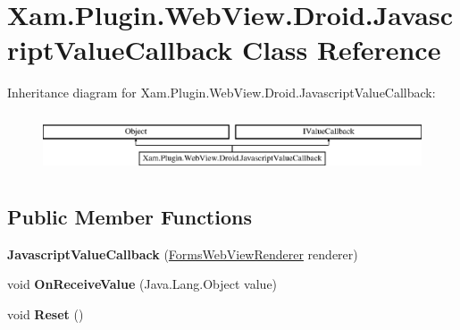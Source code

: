\hypertarget{class_xam_1_1_plugin_1_1_web_view_1_1_droid_1_1_javascript_value_callback}{}\section{Xam.\+Plugin.\+Web\+View.\+Droid.\+Javascript\+Value\+Callback Class Reference}
\label{class_xam_1_1_plugin_1_1_web_view_1_1_droid_1_1_javascript_value_callback}
Inheritance diagram for Xam.\+Plugin.\+Web\+View.\+Droid.\+Javascript\+Value\+Callback\+:\begin{figure}[H]
\begin{center}
\leavevmode
\includegraphics[height=1.744548cm]{class_xam_1_1_plugin_1_1_web_view_1_1_droid_1_1_javascript_value_callback}
\end{center}
\end{figure}
\subsection*{Public Member Functions}
\begin{DoxyCompactItemize}
\item 
\mbox{\label{class_xam_1_1_plugin_1_1_web_view_1_1_droid_1_1_javascript_value_callback_a248ae541c647ac1231a6ed3a1999c8ce}} 
{\bfseries Javascript\+Value\+Callback} (\hyperlink{class_xam_1_1_plugin_1_1_web_view_1_1_droid_1_1_forms_web_view_renderer}{Forms\+Web\+View\+Renderer} renderer)
\item 
\mbox{\label{class_xam_1_1_plugin_1_1_web_view_1_1_droid_1_1_javascript_value_callback_ac105ffd11a3eaaf7abbd6cdeaa73509a}} 
void {\bfseries On\+Receive\+Value} (Java.\+Lang.\+Object value)
\item 
\mbox{\label{class_xam_1_1_plugin_1_1_web_view_1_1_droid_1_1_javascript_value_callback_aa7ca2d5450343486c2bb2de36c77904c}} 
void {\bfseries Reset} ()
\end{DoxyCompactItemize}

